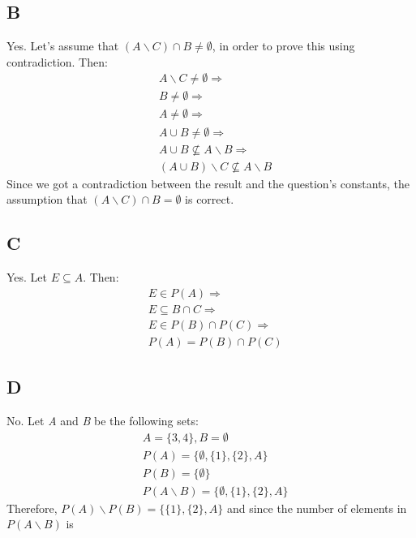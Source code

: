 \documentclass[12pt, oneside]{article}
\begin{document}
\subsection{B}
Yes. Let's assume that $(A \backslash C) \cap B \neq \emptyset$, in order to prove this using contradiction. Then:
\begin{equation*}
\begin{split}
& A \backslash C \neq \emptyset \Rightarrow \\
& B \neq \emptyset \Rightarrow \\
& A \neq \emptyset \Rightarrow \\
& A \cup B \neq \emptyset \Rightarrow \\
& A \cup B \not\subseteq A \backslash B \Rightarrow \\
& (A \cup B) \backslash C \not\subseteq A \backslash B
\end{split}
\end{equation*}
Since we got a contradiction between the result and the question's constants, the assumption that $(A \backslash C) \cap B = \emptyset$ is correct.

\subsection{C}
Yes. Let $E \subseteq A$. Then:
\begin{equation*}
\begin{split}
& E \in P(A) \Rightarrow \\
& E \subseteq B \cap C \Rightarrow \\
& E \in P(B) \cap P(C) \Rightarrow \\
& P(A) = P(B) \cap P(C)
\end{split}
\end{equation*}

\subsection{D}
No. Let \emph{A} and \emph{B} be the following sets:
\begin{equation*}
\begin{split}
& A = \{3, 4\}, B = \emptyset\\
& P(A) = \{\emptyset, \{1\}, \{2\}, A\}\\
& P(B) = \{\emptyset\}\\
& P(A \backslash B) = \{\emptyset, \{1\}, \{2\}, A\}
\end{split}
\end{equation*}
Therefore, $P(A) \backslash P(B) = \{\{1\}, \{2\}, A\}$ and since the number of elements in $P(A \backslash B)$ is 
\end{document}
